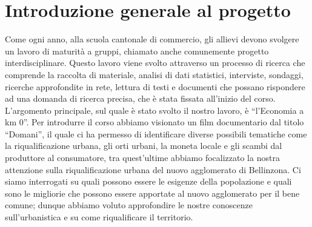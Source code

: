 \section{Introduzione generale al progetto}
Come ogni anno, alla scuola cantonale di commercio, gli allievi devono svolgere un lavoro di maturità a gruppi, chiamato anche comunemente progetto interdisciplinare. Questo lavoro viene svolto attraverso un processo di ricerca che comprende la raccolta di materiale, analisi di dati statistici, interviste, sondaggi, ricerche approfondite in rete, lettura di testi e documenti che possano rispondere ad una domanda di ricerca precisa, che è stata fissata all’inizio del corso.
L’argomento principale, sul quale è stato svolto il nostro lavoro, è “l’Economia a km 0”. Per introdurre il corso abbiamo visionato un film documentario dal titolo “Domani”, il quale ci ha permesso di identificare diverse possibili tematiche come la riqualificazione urbana, gli orti urbani, la moneta locale e gli scambi dal produttore al consumatore, tra quest’ultime abbiamo focalizzato la nostra attenzione sulla riqualificazione urbana del nuovo agglomerato di Bellinzona.
Ci siamo interrogati su quali possono essere le esigenze della popolazione e quali sono le migliorie che possono essere apportate al nuovo agglomerato per il bene comune; dunque abbiamo voluto approfondire le nostre conoscenze sull’urbanistica e su come riqualificare il territorio. 

